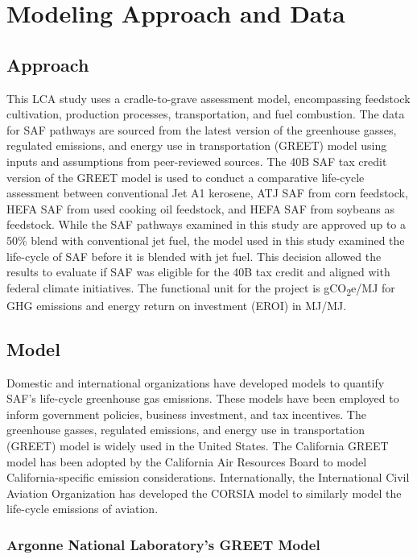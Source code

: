 \documentclass[12pt]{article}
\begin{document}
\section{Modeling Approach and Data}

\subsection{Approach}

This LCA study uses a cradle-to-grave assessment model, encompassing feedstock cultivation, production processes, transportation, and fuel combustion. The data for SAF pathways are sourced from the latest version of the greenhouse gasses, regulated emissions, and energy use in transportation (GREET) model using inputs and assumptions from peer-reviewed sources.  The 40B SAF tax credit version of the GREET model is used to conduct a comparative life-cycle assessment between conventional Jet A1 kerosene, ATJ SAF from corn feedstock, HEFA SAF from used cooking oil feedstock, and HEFA SAF from soybeans as feedstock. While the SAF pathways examined in this study are approved up to a  50\%  blend with conventional jet fuel, the model used in this study examined the life-cycle of SAF before it is blended with jet fuel. This decision allowed the results to evaluate if SAF was eligible for the 40B tax credit and aligned with federal climate initiatives. The functional unit for the project is gCO\textsubscript{2}e/MJ for GHG emissions and energy return on investment (EROI) in MJ/MJ.

\subsection{Model}

Domestic and international organizations have developed models to quantify SAF's life-cycle greenhouse gas emissions. These models have been employed to inform government policies, business investment, and tax incentives. The greenhouse gasses, regulated emissions, and energy use in transportation (GREET) model is widely used in the United States. The California GREET model has been adopted by the California Air Resources Board to model California-specific emission considerations. Internationally, the International Civil Aviation Organization has developed the CORSIA model to similarly model the life-cycle emissions of aviation. 


\subsubsection{Argonne National Laboratory’s GREET Model}
\end{document}
